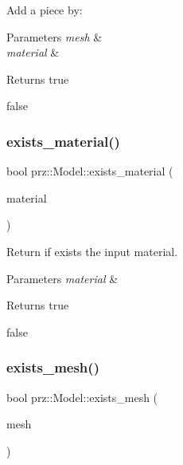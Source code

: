 Add a piece by\+: 


\begin{DoxyParams}{Parameters}
{\em mesh} & \\
\hline
{\em material} & \\
\hline
\end{DoxyParams}
\begin{DoxyReturn}{Returns}
true 

false 
\end{DoxyReturn}
\mbox{\label{classprz_1_1_model_a7d0d73cf0a3adf35a3a2cceddbde878e}} 
\subsubsection{\texorpdfstring{exists\_material()}{exists\_material()}}
{\footnotesize\ttfamily bool prz\+::\+Model\+::exists\+\_\+material (\begin{DoxyParamCaption}\item[{P\+S\+Ptr$<$ \mbox{\hyperlink{classprz_1_1_material}{Material}} $>$}]{material }\end{DoxyParamCaption})\hspace{0.3cm}{\ttfamily [inline]}}



Return if exists the input material. 


\begin{DoxyParams}{Parameters}
{\em material} & \\
\hline
\end{DoxyParams}
\begin{DoxyReturn}{Returns}
true 

false 
\end{DoxyReturn}
\mbox{\label{classprz_1_1_model_a9abedee0fc21b70b26df34720dfa376c}} 
\subsubsection{\texorpdfstring{exists\_mesh()}{exists\_mesh()}}
{\footnotesize\ttfamily bool prz\+::\+Model\+::exists\+\_\+mesh (\begin{DoxyParamCaption}\item[{P\+S\+Ptr$<$ \mbox{\hyperlink{classprz_1_1_mesh}{Mesh}} $>$}]{mesh }\end{DoxyParamCaption})\hspace{0.3cm}{\ttfamily [inline]}}



